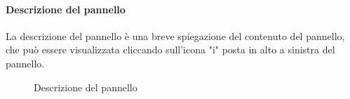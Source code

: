 \paragraph{Descrizione del pannello}
La descrizione del pannello è una breve spiegazione del contenuto del pannello, che può essere visualizzata cliccando sull'icona "i" posta in alto a sinistra del pannello.  
\begin{figure}[H]
    \centering
    \caption{Descrizione del pannello}
    \label{fig:my_label}
\end{figure}

